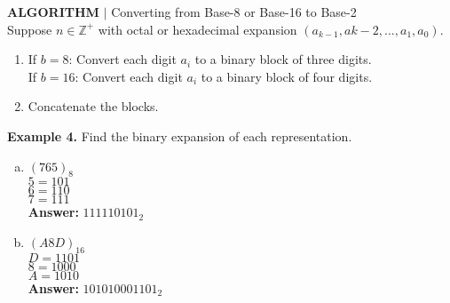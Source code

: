 \documentclass [12pt]{article}
\begin{document}
\begin{framed}
\noindent\textbf{ALGORITHM} $|$ Converting from Base-8 or Base-16 to Base-2\\
Suppose $n\in\mathbb{Z^+}$ with octal or hexadecimal expansion $(a_{k-1}, a{k-2},...,a_1,a_0)$.
\begin{enumerate}[\quad1.]
    \item If $b=8$: Convert each digit $a_i$ to a binary block of three digits.\\
    \quad If $b=16$: Convert each digit $a_i$ to a binary block of four digits.
    \item Concatenate the blocks.
\end{enumerate}
\end{framed}
\noindent\textbf{Example 4.} Find the binary expansion of each representation.\\
\begin{multicols}{2}
\begin{enumerate}[(a)]
    \item $(765)_8$\\
    \quad $5=101$\\
    \quad $6=110$\\
    \quad $7=111$\\
    \quad\textbf{Answer:} $111110101_2$
    \columnbreak
    \item $(A8D)_{16}$\\
    \quad $D=1101$\\
    \quad $8=1000$\\
    \quad $A=1010$\\
    \quad\textbf{Answer:} $101010001101_2$
\end{enumerate}
\end{multicols}
\end{document}
